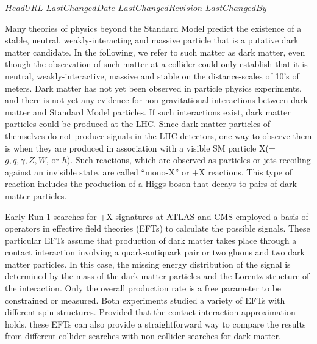 \svnidlong
{$HeadURL$}
{$LastChangedDate$}
{$LastChangedRevision$}
{$LastChangedBy$}

Many theories of physics beyond the Standard Model predict the existence
of a stable, neutral, weakly-interacting and massive particle that is
a putative dark matter candidate.   In the following, we refer to such
matter as dark matter, even though the observation of such matter at a collider
could only establish that it is neutral, weakly-interactive, massive and stable
on the distance-scales of 10's of meters.
Dark matter has not yet been observed in particle physics experiments, and
there is not yet any evidence for non-gravitational interactions
between dark matter and Standard Model particles.  If such
interactions exist, dark matter particles could be produced
at the LHC. Since dark matter particles of themselves do not produce signals
in the LHC
detectors, one way to observe them is when they are produced in association
with a visible SM particle X(=$g, q, \gamma, Z, W$, or $h$).
Such reactions, which are
observed as particles or jets recoiling against an invisible state, are
called ``mono-X'' or \MET{}+X reactions.
This type of reaction includes the production of a Higgs boson that
decays to pairs of dark matter particles.


Early Run-1 searches for \MET{}+X signatures at ATLAS and CMS employed
a basis of operators in 
effective field theories (EFTs) \cite{Goodman:2010yf,Goodman:2010ku} to
calculate the possible signals.
These particular EFTs assume that production of dark matter takes place through
a contact interaction involving a quark-antiquark pair or two gluons and
two dark matter particles.  In this case,
the missing
energy distribution of the signal is determined
by the mass of the dark
matter particles and the Lorentz structure of the interaction. Only the
overall production rate is a free parameter to be constrained or measured.
Both experiments studied a variety
of EFTs with different spin structures. Provided that the contact
interaction approximation holds, these EFTs can also provide a
straightforward way to compare the results from different collider
searches with non-collider searches for dark matter.  



